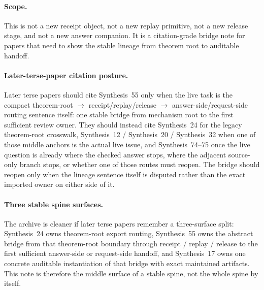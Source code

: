 \documentclass[11pt]{article}
\begin{document}
\paragraph{Scope.}
This is not a new receipt object, not a new replay primitive, not a new release stage, and not a new answer companion.
It is a citation-grade bridge note for papers that need to show the stable lineage from theorem root to auditable handoff.
\paragraph{Later-terse-paper citation posture.}
Later terse papers should cite Synthesis~55 only when the live task is the compact theorem-root $\to$ receipt/replay/release $\to$ answer-side/request-side routing sentence itself: one stable bridge from mechanism root to the first sufficient review owner. They should instead cite Synthesis~24 for the legacy theorem-root crosswalk, Synthesis~12 / Synthesis~20 / Synthesis~32 when one of those middle anchors is the actual live issue, and Synthesis~74--75 once the live question is already where the checked answer stops, where the adjacent source-only branch stops, or whether one of those routes must reopen. The bridge should reopen only when the lineage sentence itself is disputed rather than the exact imported owner on either side of it.\cite{series:mathcrosswalk,series:receiptitems,series:auditorreplay,series:releasespine,series:pairedterminalcitationdiscipline,series:pairedterminalcutoverrules}

\paragraph{Three stable spine surfaces.}
The archive is cleaner if later terse papers remember a three-surface split: Synthesis~24 owns theorem-root export routing, Synthesis~55 owns the abstract bridge from that theorem-root boundary through receipt / replay / release to the first sufficient answer-side or request-side handoff, and Synthesis~17 owns one concrete auditable instantiation of that bridge with exact maintained artifacts. This note is therefore the middle surface of a stable spine, not the whole spine by itself.\cite{series:mathcrosswalk,series:workedexample}
\end{document}
